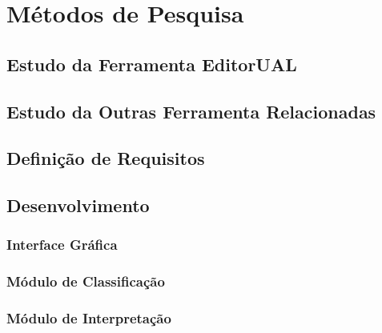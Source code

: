 
\chapter{Métodos de Pesquisa}

\section{Estudo da Ferramenta EditorUAL}

\section{Estudo da Outras Ferramenta Relacionadas}

\section{Definição de Requisitos}

\section{Desenvolvimento}

\subsection{Interface Gráfica}

\subsection{Módulo de Classificação}

\subsection{Módulo de Interpretação}
